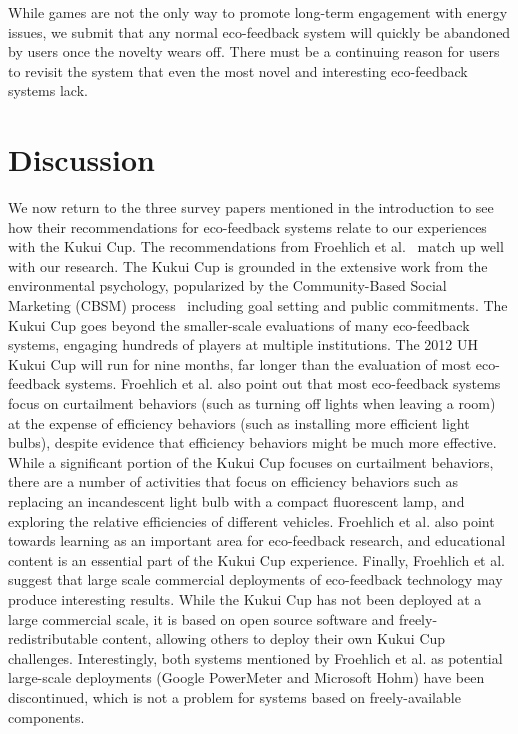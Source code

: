 \documentclass{sigchi}
\begin{document}
While games are not the only way to promote long-term engagement with energy issues, we submit that any normal eco-feedback system will quickly be abandoned by users once the novelty wears off. There must be a continuing reason for users to revisit the system that even the most novel and interesting eco-feedback systems lack.


\section{Discussion}

We now return to the three survey papers mentioned in the introduction to see how their recommendations for eco-feedback systems relate to our experiences with the Kukui Cup. The recommendations from Froehlich et al.~\cite{Froehlich2010} match up well with our research. The Kukui Cup is grounded in the extensive work from the environmental psychology, popularized by the Community-Based Social Marketing (CBSM) process~\cite{McKenzie-Mohr2009} including goal setting and public commitments. The Kukui Cup goes beyond the smaller-scale evaluations of many eco-feedback systems, engaging hundreds of players at multiple institutions. The 2012 UH Kukui Cup will run for nine months, far longer than the evaluation of most eco-feedback systems. Froehlich et al. also point out that most eco-feedback systems focus on curtailment behaviors (such as turning off lights when leaving a room) at the expense of efficiency behaviors (such as installing more efficient light bulbs), despite evidence that efficiency behaviors might be much more effective. While a significant portion of the Kukui Cup focuses on curtailment behaviors, there are a number of activities that focus on efficiency behaviors such as replacing an incandescent light bulb with a compact fluorescent lamp, and exploring the relative efficiencies of different  vehicles. Froehlich et al. also point towards learning as an important area for eco-feedback research, and educational content is an essential part of the Kukui Cup experience. Finally, Froehlich et al. suggest that large scale commercial deployments of eco-feedback technology may produce interesting results. While the Kukui Cup has not been deployed at a large commercial scale, it is based on open source software and freely-redistributable content, allowing others to deploy their own Kukui Cup challenges. Interestingly, both systems mentioned by Froehlich et al. as potential large-scale deployments (Google PowerMeter and Microsoft Hohm) have been discontinued, which is not a problem for systems based on freely-available components.
\end{document}
